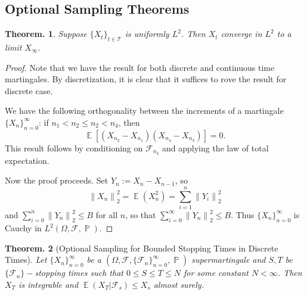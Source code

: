 \documentclass[11pt, a4paper]{memoir}
\newcommand{\norm}[1]{\ensuremath{\left\lVert#1\right\rVert}}
\theoremstyle{change}
\newtheorem{theorem}{Theorem.}[section]
\theoremstyle{plain}
\theoremstyle{nonumberplain}
\newtheorem{proof}{Proof}
\DeclareMathOperator{\pr}{{\mathbb{P}}}
\DeclareMathOperator{\E}{{\mathbb{E}}}
\numberwithin{equation}{section}
\begin{document}
\subsection{Optional Sampling Theorems}
\begin{theorem}
    Suppose $\{X_t\}_{t\in\mathcal{T}}$ is uniformly $L^2$.
    Then $X_t$ converge in $L^2$ to a limit $X_\infty$.
\end{theorem}
\begin{proof}
    Note that we have the result for both discrete and continuous time martingales.
    By discretization, it is clear that it suffices to rove the result for discrete case.

    We have the following orthogonality between the increments of a martingale $\{X_n\}_{n=0}^\infty$: if $n_1<n_2\leq n_2<n_4$, then
    \begin{equation*}
        \E[(X_{n_2}-X_{n_1})(X_{n_4}-X_{n_3})]=0.
    \end{equation*}
    This result follows by conditioning on $\mathcal{F}_{n_3}$ and applying the law of total expectation.

    Now the proof proceeds.
    Set $Y_n:=X_n-X_{n-1}$, so
    \begin{equation*}
        \norm{X_n}_2^2=\E(X_n^2)=\sum_{i=1}^n\norm{Y_i}_2^2
    \end{equation*}
    and $\sum_{i=0}^n\norm{Y_n}_2^2\leq B$ for all $n$, so that $\sum_{i=0}^\infty\norm{Y_n}_2^2\leq B$.
    Thus $\{X_n\}_{n=0}^\infty$ is Cauchy in $L^2(\Omega,\mathcal{F},\pr)$.
\end{proof}
\begin{theorem}[Optional Sampling for Bounded Stopping Times in Discrete Times]
    Let $\{X_n\}_{n=0}^\infty$ be a $(\Omega,\mathcal{F},\{\mathcal{F}_n\}_{n=0}^\infty,\pr)$ supermartingale and $S,T$ be $\{\mathcal{F}_n\}-$stopping times such that $0\leq S\leq T\leq N$ for some constant $N<\infty$.
    Then $X_T$ is integrable and $\E(X_T|\mathcal{F}_s)\leq X_s$ almost surely.
\end{theorem}
\end{document}
